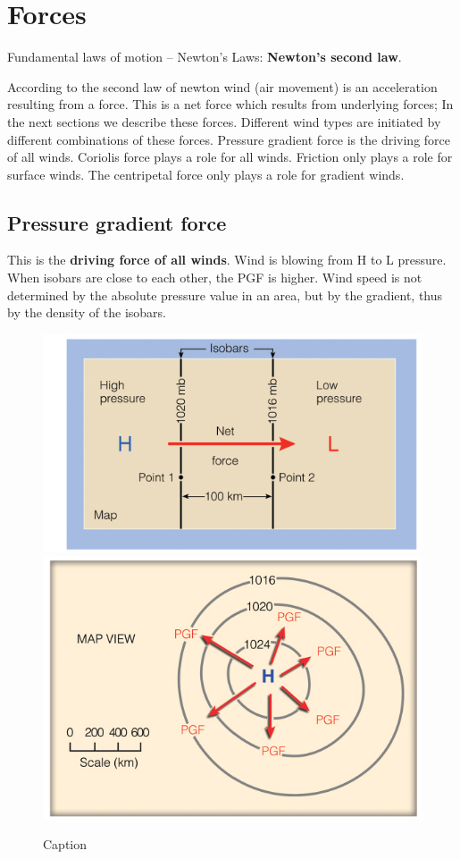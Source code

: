 \documentclass[oneside]{book}
\begin{document}
\section{Forces}\label{forces}

Fundamental laws of motion -- Newton's Laws: \textbf{Newton's second
law}.

According to the second law of newton wind (air movement) is an
acceleration resulting from a force. This is a net force which results
from underlying forces; In the next sections we describe these forces.
Different wind types are initiated by different combinations of these
forces. Pressure gradient force is the driving force of all winds.
Coriolis force plays a role for all winds. Friction only plays a role
for surface winds. The centripetal force only plays a role for gradient
winds.

\subsection{Pressure gradient force}\label{pressure-gradient-force}

This is the \textbf{driving force of all winds}. Wind is blowing from H
to L pressure. When isobars are close to each other, the PGF is higher.
Wind speed is not determined by the absolute pressure value in an area,
but by the gradient, thus by the density of the isobars.

\begin{figure}

{\centering \includegraphics[width=0.4\linewidth]{figures/Figure45a} \includegraphics[width=0.4\linewidth]{figures/Figure45b} 

}

\caption{Caption}\label{fig:Pgradforce}
\end{figure}
\end{document}
